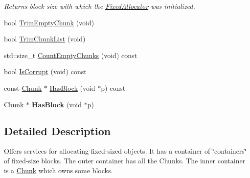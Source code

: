 \begin{DoxyCompactItemize}
\begin{DoxyCompactList}\small\item\em Returns block size with which the \hyperlink{classLoki_1_1FixedAllocator}{Fixed\+Allocator} was initialized. \end{DoxyCompactList}\item 
bool \hyperlink{classLoki_1_1FixedAllocator_a4df95a9324de31f05d931f2eea25165e}{Trim\+Empty\+Chunk} (void)
\item 
bool \hyperlink{classLoki_1_1FixedAllocator_a2b92d73c032c2ae6942ef9aadf6f27fc}{Trim\+Chunk\+List} (void)
\item 
std\+::size\+\_\+t \hyperlink{classLoki_1_1FixedAllocator_ae74cbab50e78bfa115d7c0fcdce00641}{Count\+Empty\+Chunks} (void) const 
\item 
bool \hyperlink{classLoki_1_1FixedAllocator_a41a7ad189cba00f504635aade8b3d15c}{Is\+Corrupt} (void) const 
\item 
const \hyperlink{classLoki_1_1Chunk}{Chunk} $\ast$ \hyperlink{classLoki_1_1FixedAllocator_af84b504579cea189ce1c415ee8ed5d2c}{Has\+Block} (void $\ast$p) const 
\item 
\hypertarget{classLoki_1_1FixedAllocator_a83fb007d47ab1653a9cba11c87ea3df1}{}\hyperlink{classLoki_1_1Chunk}{Chunk} $\ast$ {\bfseries Has\+Block} (void $\ast$p)\label{classLoki_1_1FixedAllocator_a83fb007d47ab1653a9cba11c87ea3df1}

\end{DoxyCompactItemize}


\subsection{Detailed Description}
Offers services for allocating fixed-\/sized objects. It has a container of \char`\"{}containers\char`\"{} of fixed-\/size blocks. The outer container has all the Chunks. The inner container is a \hyperlink{classLoki_1_1Chunk}{Chunk} which owns some blocks.


